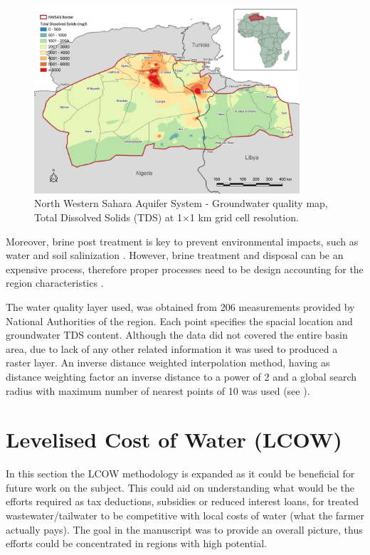 \documentclass[12pt]{iopart}
\begin{document}
\begin{figure}[!h]
	\centering
	\includegraphics[width=0.88\textwidth, cfbox=black 1pt 0pt]{NWSAS_TDS}
	\caption[NWSAS groundwater quality map - Total Dissolved Solids (TDS)]{North Western Sahara Aquifer System - Groundwater quality map, Total Dissolved Solids (TDS) at 1$\times$1 km grid cell resolution.}
	\label{fig:TDS}
\end{figure}

Moreover, brine post treatment is key to prevent environmental impacts, such as water and soil salinization \cite{panBrackishWaterDesalination2020}. However, brine treatment and disposal can be an expensive process, therefore proper processes need to be design accounting for the region characteristics \cite{panBrackishWaterDesalination2020}. 

The water quality layer used, was obtained from 206 measurements provided by National Authorities of the region. Each point specifies the spacial location and groundwater TDS content. Although the data did not covered the entire basin area, due to lack of any other related information it was used to produced a raster layer. An inverse distance weighted interpolation method, having as distance weighting factor an inverse distance to a power of 2 and a global search radius with maximum number of nearest points of 10 was used (see ).

\section{Levelised Cost of Water (LCOW)}
In this section the LCOW methodology is expanded as it could be beneficial for future work on the subject. This could aid on understanding what would be the efforts required as tax deductions, subsidies or reduced interest loans, for treated wastewater/tailwater to be competitive with local costs of water (what the farmer actually pays). The goal in the manuscript was to provide an overall picture, thus efforts could be concentrated in regions with high potential.
\end{document}
